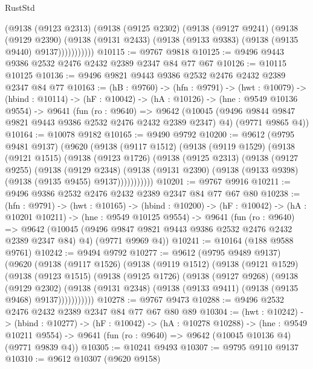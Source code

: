 \begin{lexlean}{RustStd}
\begin{coremodule}
            (@9138
              (@9123 @2313)
              (@9138
                (@9125 @2302)
                (@9138
                  (@9127 @9241)
                  (@9138
                    (@9129 @2390)
                    (@9138 (@9131 @2433) (@9138 (@9133 @9383) (@9138 (@9135 @9440) @9137)))))))))))
@10115 := @9767 @9818
@10125 := @9496 @9443 @9386 @2532 @2476 @2432 @2389 @2347 @84 @77 @67
@10126 := @10115 @10125
@10136 := @9496 @9821 @9443 @9386 @2532 @2476 @2432 @2389 @2347 @84 @77
@10163 := (hB : @9760) ->
  (hfn : @9791) ->
  (hwt : @10079) ->
  (hbind : @10114) ->
  (hF : @10042) ->
  (hA : @10126) ->
  (hne : @9549 @10136 @9554) ->
  @9641
    (fun (ro : @9640) =>
    @9642
      (@10045 (@9496 @9844 @9847 @9821 @9443 @9386 @2532 @2476 @2432 @2389 @2347) @4)
      (@9771 @9865 @4))
@10164 := @10078 @9182
@10165 := @9490 @9792
@10200 := @9612
    (@9795 @9481 @9137)
    (@9620
      (@9138
        (@9117 @1512)
        (@9138
          (@9119 @1529)
          (@9138
            (@9121 @1515)
            (@9138
              (@9123 @1726)
              (@9138
                (@9125 @2313)
                (@9138
                  (@9127 @9255)
                  (@9138
                    (@9129 @2348)
                    (@9138 (@9131 @2390) (@9138 (@9133 @9398) (@9138 (@9135 @9455) @9137)))))))))))
@10201 := @9767 @9916
@10211 := @9496 @9386 @2532 @2476 @2432 @2389 @2347 @84 @77 @67 @80
@10238 := (hfn : @9791) ->
  (hwt : @10165) ->
  (hbind : @10200) ->
  (hF : @10042) ->
  (hA : @10201 @10211) ->
  (hne : @9549 @10125 @9554) ->
  @9641
    (fun (ro : @9640) =>
    @9642
      (@10045 (@9496 @9847 @9821 @9443 @9386 @2532 @2476 @2432 @2389 @2347 @84) @4)
      (@9771 @9969 @4))
@10241 := @10164 (@188 @9588 @9761)
@10242 := @9494 @9792
@10277 := @9612
    (@9795 @9489 @9137)
    (@9620
      (@9138
        (@9117 @1526)
        (@9138
          (@9119 @1512)
          (@9138
            (@9121 @1529)
            (@9138
              (@9123 @1515)
              (@9138
                (@9125 @1726)
                (@9138
                  (@9127 @9268)
                  (@9138
                    (@9129 @2302)
                    (@9138 (@9131 @2348) (@9138 (@9133 @9411) (@9138 (@9135 @9468) @9137)))))))))))
@10278 := @9767 @9473
@10288 := @9496 @2532 @2476 @2432 @2389 @2347 @84 @77 @67 @80 @89
@10304 := (hwt : @10242) ->
  (hbind : @10277) ->
  (hF : @10042) ->
  (hA : @10278 @10288) ->
  (hne : @9549 @10211 @9554) ->
  @9641 (fun (ro : @9640) => @9642 (@10045 @10136 @4) (@9771 @9839 @4))
@10305 := @10241 @9493
@10307 := @9795 @9110 @9137
@10310 := @9612 @10307 (@9620 @9158)

\end{coremodule}
\end{lexlean}
